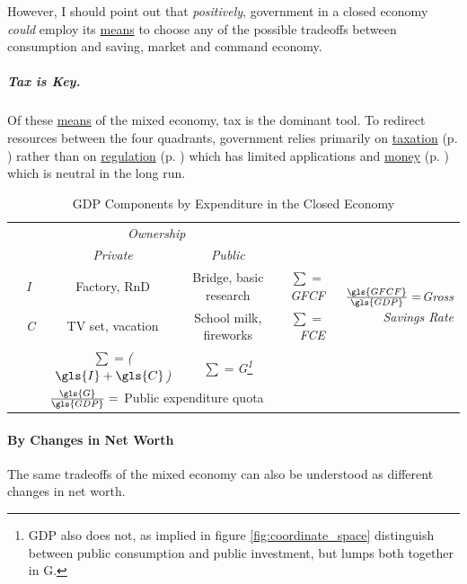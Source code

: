 However, I should point out that \emph{positively}, government in a closed economy \emph{could} employ its \hyperref[sec:means]{means} to choose any of the possible tradeoffs between consumption and saving, market and command economy. 

\subparagraph[Tax is Key]{Tax is Key.} Of these \hyperref[sec:means]{means} of the mixed economy, tax is the dominant tool. To redirect resources between the four quadrants, government relies primarily on \hyperref[sec:fiscal]{taxation} (p. \pageref{sec:fiscal}) rather than on \hyperref[sec:regulatory]{regulation} (p. \pageref{sec:regulatory}) which has limited applications and \hyperref[sec:monetary]{money} (p. \pageref{sec:monetary}) which is neutral in the long run.

\begin{landscape}%
\begin{table}
	\caption{GDP Components by Expenditure in the Closed Economy}
	\label{tab:GDP_Comp_Exp}
	\small
	\begin{center}
	\renewcommand{\arraystretch}{1.5}
	\begin{tabular}{llccrr}
		\toprule
		& & \multicolumn{2}{c}{\emph{Ownership}} & &\\
		\cmidrule(r){3-4}
		& &\emph{Private} & \emph{Public}& &\\
		\midrule
		\multirow{2}{*}{\emph{}} & \emph{\gls{I}} & Factory,  \gls{RnD} & Bridge, basic research & \emph{$\sum=$\gls{GFCF}} & \multirow{2}{*}{\emph{$\frac{\gls{GFCF}}{\gls{GDP}}=$Gross Savings Rate}}\\
		& \emph{\gls{C}} & TV set, vacation & School milk, fireworks & \emph{$\sum=$\gls{FCE}}  \\
		\midrule
		& &\emph{$\sum=$($\gls{I}+\gls{C}$)} & \emph{$\sum=$\gls{G}\footnote{\Gls{GDP} also does not, as implied in figure \ref{fig:coordinate_space} distinguish between public consumption and public investment, but lumps both together in \gls{G}.}}\\
		\cmidrule(r){3-4}
		& & \multicolumn{2}{c}{$\frac{\gls{G}}{\gls{GDP}}=$ Public expenditure quota} \\
		\bottomrule
	\end{tabular}
	\end{center}
\end{table}
\end{landscape}

\paragraph{By Changes in Net Worth}  \label{sec:delta_net_worth} The same tradeoffs of the mixed economy can also be understood as different changes in net worth. 

